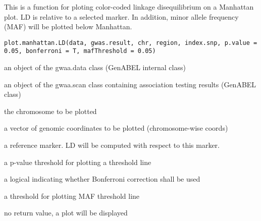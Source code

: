 \documentclass[a4paper]{book}
\begin{document}
%
\begin{Description}\relax
This is a function for ploting color-coded linkage disequilibrium on a Manhattan plot. LD is relative to a selected marker. In addition, minor allele frequency (MAF) will be plotted below Manhattan. 
\end{Description}
%
\begin{Usage}
\begin{verbatim}
plot.manhattan.LD(data, gwas.result, chr, region, index.snp, p.value = 0.05, bonferroni = T, mafThreshold = 0.05)
\end{verbatim}
\end{Usage}
%
\begin{Arguments}
\begin{ldescription}
\item[\code{data}] 
an object of the gwaa.data class (GenABEL internal class)

\item[\code{gwas.result}] 
an object of the gwaa.scan class containing association testing results (GenABEL class)

\item[\code{chr}] 
the chromosome to be plotted

\item[\code{region}] 
a vector of genomic coordinates to be plotted (chromosome-wise coords)

\item[\code{index.snp}] 
a reference marker. LD will be computed with respect to this marker.

\item[\code{p.value}] 
a p-value threshold for plotting a threshold line

\item[\code{bonferroni}] 
a logical indicating whether Bonferroni correction shall be used

\item[\code{mafThreshold}] 
a threshold for plotting MAF threshold line

\end{ldescription}
\end{Arguments}
%
\begin{Value}
no return value, a plot will be displayed
\end{Value}
\end{document}

